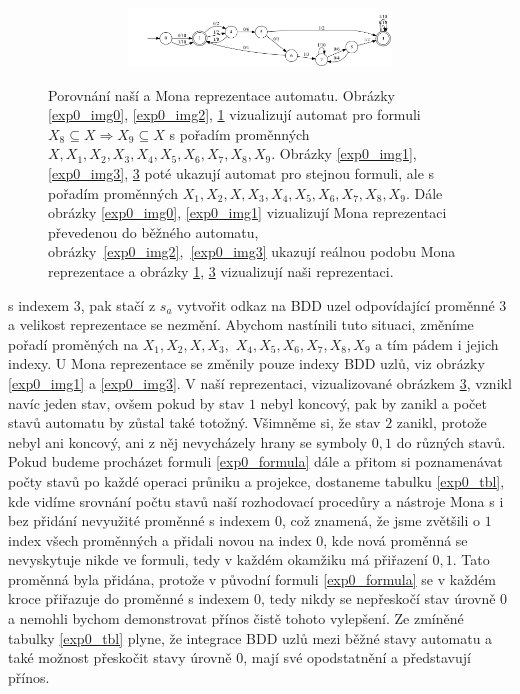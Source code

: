 \begin{figure}[h]
\begin{subfigure}{.99\textwidth}
\begin{subfigure}{.49\textwidth}
            \caption{}
            \label{exp0_img4}
        \end{subfigure}
        \hfil
        \begin{subfigure}{.49\textwidth}
            \centering
            \includegraphics[scale=0.19]{obrazky-figures/exp0_1_we_aut.png}
            \caption{}
            \label{exp0_img5}
        \end{subfigure}
    \end{subfigure} 
    \caption{Porovnání naší a Mona reprezentace automatu. Obrázky \ref{exp0_img0}, \ref{exp0_img2}, \ref{exp0_img4} vizualizují automat pro formuli $X_8 \subseteq X \Rightarrow X_9 \subseteq X$ s pořadím proměnných $X, X_1, X_2, X_3, X_4, X_5, X_6, X_7, X_8, X_9$. Obrázky \ref{exp0_img1}, \ref{exp0_img3}, \ref{exp0_img5} poté ukazují automat pro stejnou formuli, ale s pořadím proměnných $X_1, X_2, X, X_3, X_4, X_5, X_6, X_7, X_8, X_9$. Dále obrázky \ref{exp0_img0}, \ref{exp0_img1} vizualizují Mona reprezentaci převedenou do běžného automatu, obrázky~\ref{exp0_img2},~\ref{exp0_img3} ukazují reálnou podobu Mona reprezentace a obrázky \ref{exp0_img4}, \ref{exp0_img5} vizualizují naši reprezentaci.}
    \label{exp0_img}
\end{figure}

\noindent
s indexem $3$, pak stačí z $s_a$ vytvořit odkaz na BDD uzel odpovídající proměnné $3$ a velikost reprezentace se nezmění. Abychom nastínili tuto situaci, změníme pořadí proměných na $X_1, X_2, X, X_3,$ $X_4,X_5, X_6, X_7, X_8, X_9$ a tím pádem i jejich indexy. U Mona reprezentace se změnily pouze indexy BDD uzlů, viz obrázky \ref{exp0_img1} a \ref{exp0_img3}. V naší reprezentaci, vizualizované obrázkem \ref{exp0_img5}, vznikl navíc jeden stav, ovšem pokud by stav $1$ nebyl koncový, pak by zanikl a počet stavů automatu by zůstal také totožný. Všimněme si, že stav $2$ zanikl, protože nebyl ani koncový, ani z něj nevycházely hrany se symboly $0,1$ do různých stavů. Pokud budeme procházet formuli \ref{exp0_formula} dále a přitom si poznamenávat počty stavů po každé operaci průniku a projekce, dostaneme tabulku \ref{exp0_tbl}, kde vidíme srovnání počtu stavů naší rozhodovací procedůry a nástroje Mona s i bez přidání nevyužité proměnné s indexem $0$, což znamená, že jsme zvětšili o $1$ index všech proměnných a přidali novou na index $0$, kde nová proměnná se nevyskytuje nikde ve formuli, tedy v každém okamžiku má přiřazení $0,1$. Tato proměnná byla přidána, protože v původní formuli \ref{exp0_formula} se v každém kroce přiřazuje do proměnné s indexem $0$, tedy nikdy se nepřeskočí stav úrovně $0$ a nemohli bychom demonstrovat přínos čistě tohoto vylepšení. Ze zmíněné tabulky \ref{exp0_tbl} plyne, že integrace BDD uzlů mezi běžné stavy automatu a také možnost přeskočit stavy úrovně $0$, mají své opodstatnění a představují přínos.

